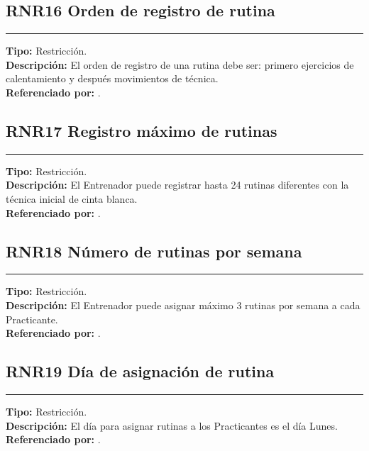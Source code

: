 \subsection{\normalsize{\textcolor[rgb]{0, 0, 0.545098}{RNR16 Orden de registro de rutina}}}
\label{rn:RNR16}
\rule[3mm]{16.59cm}{0.1mm} \vspace{1mm}
\textbf{Tipo:} Restricción.\\
\textbf{Descripción:} El orden de registro de una rutina debe ser: primero ejercicios de calentamiento y después movimientos de técnica.\\
\textbf{Referenciado por: }  .\\

\subsection{\normalsize{\textcolor[rgb]{0, 0, 0.545098}{RNR17 Registro máximo de rutinas}}}
\label{rn:RNR17}
\rule[3mm]{16.59cm}{0.1mm} \vspace{1mm}
\textbf{Tipo:} Restricción.\\
\textbf{Descripción:} El Entrenador puede registrar hasta 24 rutinas diferentes con la técnica inicial de cinta blanca.\\
\textbf{Referenciado por: }  .\\

\subsection{\normalsize{\textcolor[rgb]{0, 0, 0.545098}{RNR18 Número de rutinas por semana}}}
\label{rn:RNR18}
\rule[3mm]{16.59cm}{0.1mm} \vspace{1mm}
\textbf{Tipo:} Restricción.\\
\textbf{Descripción:} El Entrenador puede asignar máximo 3 rutinas por semana a cada Practicante. \\
\textbf{Referenciado por: }  .\\

\subsection{\normalsize{\textcolor[rgb]{0, 0, 0.545098}{RNR19 Día de asignación de rutina}}}
\label{rn:RNR19}
\rule[3mm]{16.59cm}{0.1mm} \vspace{1mm}
\textbf{Tipo:} Restricción.\\
\textbf{Descripción:} El día para asignar rutinas a los Practicantes es el día Lunes.\\
\textbf{Referenciado por: }  .\\

